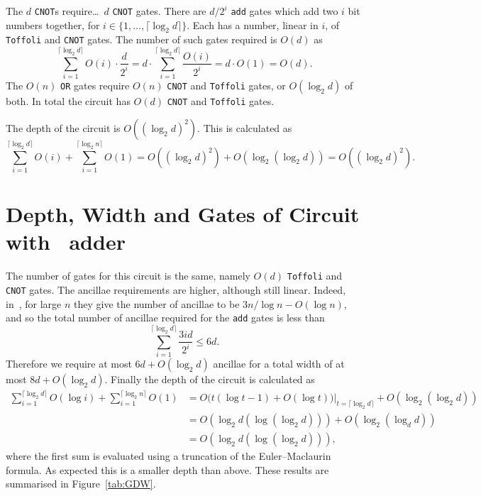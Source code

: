 \documentclass[notitlepage]{article}
\theoremstyle{definition}
\begin{document}
The $d$ \texttt{CNOT}s require\dots\ $d$ \texttt{CNOT} gates.
There are $d/2^{i}$ \texttt{add} gates which add two $i$ bit numbers together, for $i \in \{1, \dots, \lceil \log_{2}d\rceil\}$. Each has a number, linear in $i$, of \texttt{Toffoli} and \texttt{CNOT} gates. The number of such gates required is $O(d)$ as
\[
    \displaystyle\sum\limits_{i = 1}^{\lceil \log_{2} d\rceil}{O(i)} \cdot \frac{d}{2^{i}} = d \cdot \displaystyle\sum\limits_{i = 1}^{\lceil \log_{2}d \rceil}{\frac{O(i)}{2^{i}}} = d \cdot O(1) = O(d).
\]
The $O(n)$ \texttt{OR} gates require $O(n)$ \texttt{CNOT} and \texttt{Toffoli} gates, or $O(\log_{2}d)$ of both.
In total the circuit has $O(d)$ \texttt{CNOT} and \texttt{Toffoli} gates.

The depth of the circuit is $O\left({(\log_{2}d)}^{2}\right)$. This is calculated as
\[
    \displaystyle\sum\limits_{i = 1}^{\lceil\log_{2}d\rceil}{O(i)} + \displaystyle\sum\limits_{i = 1}^{\lceil \log_{2}n\rceil}{O(1)} = O\left({(\log_{2} d)}^{2}\right) + O\left(\log_{2}(\log_{2}d)\right) = O\left({(\log_{2} d)}^{2}\right).
\]

\section*{Depth, Width and Gates of Circuit with~\cite{Takahashi:2008:FQC} adder}

The number of gates for this circuit is the same, namely $O(d)$ \texttt{Toffoli} and \texttt{CNOT} gates.
The ancillae requirements are higher, although still linear.
Indeed, in~\cite{Takahashi:2008:FQC}, for large $n$ they give the number of ancillae to be $3n/\log n - O(\log n)$, and so the total number of ancillae required for the \texttt{add} gates is less than
\[
    \displaystyle\sum\limits_{i = 1}^{\lceil \log_{2}d\rceil}{\frac{3id}{2^{i}}} \leq 6d.
\]
Therefore we require at most $6d + O(\log_{2}d)$ ancillae for a total width of at most $8d + O(\log_{2}d)$.
Finally the depth of the circuit is calculated as  %
\begin{align*}
    \displaystyle\sum\limits_{i = 1}^{\lceil \log_{2}d\rceil}{O(\log i)} + \displaystyle\sum\limits_{i = 1}^{\lceil \log_{2}n\rceil}{O(1)} &= O\Big(t(\log t - 1) + O(\log t)\Big)\Big|_{t = \lceil\log_{2}d\rceil} + O\left(\log_{2}(\log_{2}d)\right)\\
    &= O\left(\log_{2}d\left(\log(\log_{2}d)\right)\right) + O\left(\log_{2}(\log_{d}d)\right)\\
    &= O\left(\log_{2}d\left(\log(\log_{2}d)\right)\right),
\end{align*}
where the first sum is evaluated using a truncation of the Euler--Maclaurin formula. %
As expected this is a smaller depth than above.
These results are summarised in Figure~\ref{tab:GDW}.
\end{document}
